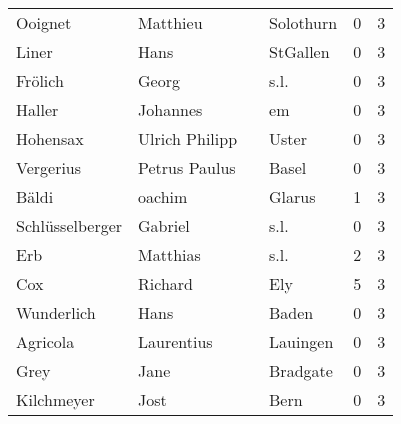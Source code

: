 \documentclass[10pt,a4paper,landscape]{article}
\begin{document}
\begin{longtable}{llllrr}
                  Ooignet &                           Matthieu &             &                                   Solothurn &          0 &         3 \\
                    Liner &                               Hans &             &                                    StGallen &          0 &         3 \\
                  Frölich &                              Georg &             &                                        s.l. &          0 &         3 \\
                   Haller &                           Johannes &             &                                          em &          0 &         3 \\
                 Hohensax &                     Ulrich Philipp &             &                                       Uster &          0 &         3 \\
                Vergerius &                      Petrus Paulus &             &                                       Basel &          0 &         3 \\
                    Bäldi &                             oachim &             &                                      Glarus &          1 &         3 \\
          Schlüsselberger &                            Gabriel &             &                                        s.l. &          0 &         3 \\
                      Erb &                           Matthias &             &                                        s.l. &          2 &         3 \\
                      Cox &                            Richard &             &                                         Ely &          5 &         3 \\
               Wunderlich &                               Hans &             &                                       Baden &          0 &         3 \\
                 Agricola &                         Laurentius &             &                                    Lauingen &          0 &         3 \\
                     Grey &                               Jane &             &                                    Bradgate &          0 &         3 \\
               Kilchmeyer &                               Jost &             &                                        Bern &          0 &         3 \\

\end{longtable}
\end{document}
